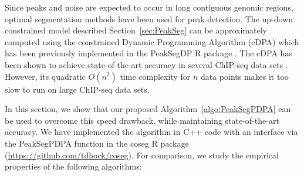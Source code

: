 \documentclass{article}
\begin{document}
Since peaks and noise are expected to occur in long contiguous genomic
regions, optimal segmentation methods have been used for peak
detection. The up-down constrained model described
Section~\ref{sec:PeakSeg} can be approximately computed using the
constrained Dynamic Programming Algorithm (cDPA) which has been
previously implemented in the PeakSegDP R package
\citep{HOCKING-PeakSeg}. The cDPA has been shown to achieve
state-of-the-art accuracy in several ChIP-seq data sets
\citep{HOCKING2016-chipseq}. However, its quadratic $O(n^2)$ time
complexity for $n$ data points makes it too slow to run on large
ChIP-seq data sets.

In this section, we show that our proposed
Algorithm~\ref{algo:PeakSegPDPA} can be used to overcome this speed
drawback, while maintaining state-of-the-art accuracy. We have
implemented the algorithm in C++ code with an interface via the
PeakSegPDPA function in the coseg R package
(\url{https://github.com/tdhock/coseg}). For comparison, we study the
empirical properties of the following algorithms:
\end{document}
